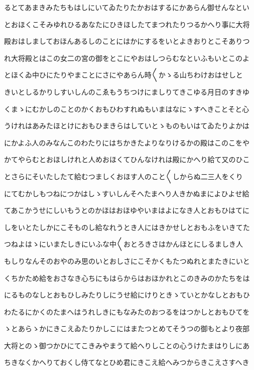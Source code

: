 \documentclass[a4paper,11pt,landscape]{ltjtarticle}
\begin{document}
るとてあまきみたちもはしにいてゐたりたかおはするにかあらん御せんなとい
\par\medskip
とおほくこそみゆれひるあなたにひきほしたてまつれたりつるかへり事に大将
\par\medskip
殿おはしましておほんあるしのことにはかにするをいとよきおりとこそありつ
\par\medskip
れ大将殿とはこの女二の宮の御をとこにやおはしつらむなといふもいとこのよ
\par\medskip
とほくゐ中ひにたりやまことにさにやあらん時〱かゝる山ちわけおはせしと
\par\medskip
きいとしるかりしすいしんのこゑもうちつけにましりてきこゆる月日のすきゆ
\par\medskip
くまゝにむかしのことのかくおもひわすれぬもいまはなにゝすへきことそと心
\par\medskip
うけれはあみたほとけにおもひまきらはしていとゝものもいはてゐたりよかは
\par\medskip
にかよふ人のみなんこのわたりにはちかきたよりなりけるかの殿はこのこをや
\par\medskip
かてやらむとおほしけれと人めおほくてひんなけれは殿にかへり給て又のひこ
\par\medskip
とさらにそいたしたて給むつましくおほす人のこと〱しからぬ二三人をくり
\par\medskip
にてむかしもつねにつかはしゝすいしんそへたまへり人きかぬまによひよせ給
\par\medskip
てあこかうせにしいもうとのかほはおほゆやいまはよになき人とおもひはてに
\par\medskip
しをいとたしかにこそものし給なれうとき人にはきかせしとおもふをいきてた
\par\medskip
つねよはゝにいまたしきにいふな中〱おとろきさはかんほとにしるましき人
\par\medskip
もしりなんそのおやのみ思のいとおしさにこそかくもたつぬれとまたきにいと
\par\medskip
くちかため給をおさなき心ちにもはらからはおほかれとこのきみのかたちをは
\par\medskip
にるものなしとおもひしみたりしにうせ給にけりときゝていとかなしとおもひ
\par\medskip
わたるにかくのたまへはうれしきにもなみたのおつるをはつかしとおもひてを
\par\medskip
ゝとあらゝかにきこえゐたりかしこにはまたつとめてそうつの御もとより夜部
\par\medskip
大将とのゝ御つかひにてこきみやまうて給へりしことの心うけたまはりしにあ
\par\medskip
ちきなくかへりておくし侍てなとひめ君にきこえ給へみつからきこえさすへき
\end{document}
